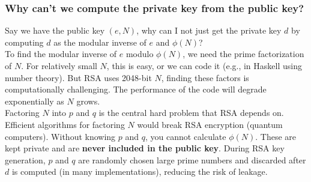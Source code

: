 \subsubsection{Why can't we compute the private key from the public key?}
Say we have the public key $(e,N)$, why can I not just get the private key $d$ by computing $d$ as the modular inverse of $e$ and $\phi(N)$? \\

To find the modular inverse of $e$ modulo $\phi(N)$, we need the prime factorization of $N$. 
For relatively small $N$, this is easy, or we can code it (e.g., in Haskell using number theory).
But RSA uses 2048-bit $N$, finding these factors is computationally challenging.
The performance of the code will degrade exponentially as $N$ grows. \\

Factoring $N$ into $p$ and $q$ is the central hard problem that RSA depends on. Efficient algorithms for factoring $N$ would break RSA encryption (quantum computers).
Without knowing $p$ and $q$, you cannot calculate $\phi(N)$. 
These are kept private and are \textbf{never included in the public key}. 
During RSA key generation, $p$ and $q$ are randomly chosen large prime numbers and discarded after $d$ is computed (in many implementations), reducing the risk of leakage.
